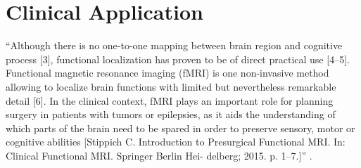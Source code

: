 \section{Clinical Application}

``Although there is no one-to-one mapping between brain region and cognitive
process [3], functional localization has proven to be of direct practical use
[4–5]. Functional magnetic resonance imaging (fMRI) is one non-invasive method
allowing to localize brain functions with limited but nevertheless remarkable
detail [6].
%
In the clinical context, fMRI plays an important role for planning surgery in
patients with tumors or epilepsies, as it aids the understanding of which parts
of the brain need to be spared in order to preserve sensory, motor or cognitive
abilities [Stippich C. Introduction to Presurgical Functional MRI. In: Clinical
Functional MRI. Springer Berlin Hei- delberg; 2015. p. 1–7.]''
\citep{wegrzyn2018thought}.

